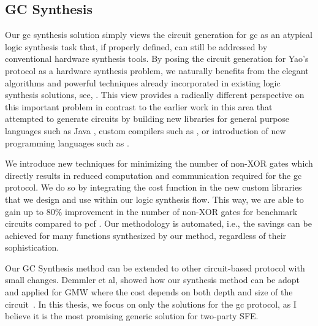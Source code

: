 \subsection{GC Synthesis}
Our gc synthesis solution simply views the circuit generation for \acrshort{gc} as an atypical logic synthesis task that, if properly defined, can still be addressed by conventional hardware synthesis tools.
By posing the circuit generation for Yao's protocol as a hardware synthesis problem, we naturally benefits from the elegant algorithms and powerful techniques already incorporated in existing logic synthesis solutions, see, \cite{sentovich1992sis,micheli1994synthesis,devadas1994logic,brayton1987mis}.
This view provides a radically different perspective on this important problem in contrast to the earlier work in this area that attempted to generate circuits by building new libraries for general purpose languages such as Java \cite{huang2011faster,malka2011vmcrypt}, custom compilers such as \cite{kreuter2013pcf,franz2014cbmc}, or introduction of new programming languages such as \cite{malkhi2004fairplay,rastogi2014wysteria}.

We introduce new techniques for minimizing the number of non-XOR gates which directly results in reduced computation and communication required for the \acrshort{gc} protocol.
We do so by integrating the cost function in the new custom libraries that we design and use within our logic synthesis flow.
This way, we are able to gain up to $80\%$ improvement in the number of non-XOR gates for benchmark circuits compared to \gls{pcf} \cite{kreuter2013pcf}.
Our methodology is automated, i.e., the savings can be achieved for many functions synthesized by our method, regardless of their sophistication.

Our GC Synthesis method can be extended to other circuit-based protocol with small changes.
Demmler et al, showed how our synthesis method can be adopt and applied for GMW where the cost depends on both depth and size of the circuit~\cite{demmler2015automated}.
In this thesis, we focus on only the solutions for the \acrshort{gc} protocol, as I believe it is the most promising generic solution for two-party SFE.

